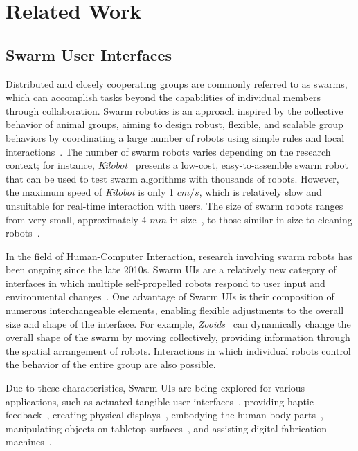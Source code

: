 \section{Related Work}
\subsection{Swarm User Interfaces}

Distributed and closely cooperating groups are commonly referred to as swarms, which can accomplish tasks beyond the capabilities of individual members through collaboration.
Swarm robotics is an approach inspired by the collective behavior of animal groups, aiming to design robust, flexible, and scalable group behaviors by coordinating a large number of robots using simple rules and local interactions~\cite{Brambilla2013}.
The number of swarm robots varies depending on the research context; for instance, \textit{Kilobot}~\cite{Kilobot2014} presents a low-cost, easy-to-assemble swarm robot that can be used to test swarm algorithms with thousands of robots.
However, the maximum speed of \textit{Kilobot} is only 1 $cm/s$, which is relatively slow and unsuitable for real-time interaction with users.
The size of swarm robots ranges from very small, approximately 4 $mm$ in size~\cite{Wu2022}, to those similar in size to cleaning robots~\cite{RoomShift2020}.

In the field of Human-Computer Interaction, research involving swarm robots has been ongoing since the late 2010s.
Swarm UIs are a relatively new category of interfaces in which multiple self-propelled robots respond to user input and environmental changes~\cite{Zooids2016,Suzuki2022,HERMITS2020,UbiSwarm2017,ShapeBots2019,disappearables2022,HapticBots2021}.
One advantage of Swarm UIs is their composition of numerous interchangeable elements, enabling flexible adjustments to the overall size and shape of the interface.
For example, \textit{Zooids}~\cite{Zooids2016} can dynamically change the overall shape of the swarm by moving collectively, providing information through the spatial arrangement of robots.
Interactions in which individual robots control the behavior of the entire group are also possible.

Due to these characteristics, Swarm UIs are being explored for various applications, such as actuated tangible user interfaces~\cite{HERMITS2020,disappearables2022}, providing haptic feedback~\cite{SwarmHaptics2019,HapticBots2021}, creating physical displays~\cite{Alonso-Mora2011,Alonso-Mora2012,Alonso-Mora2015}, embodying the human body parts~\cite{SwarmBody}, manipulating objects on tabletop surfaces~\cite{Push-That-There2024}, and assisting digital fabrication machines~\cite{FabRobotics2024}.

